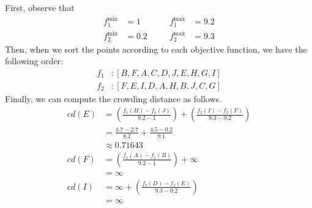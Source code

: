 First, observe that
\[
\begin{aligned}
    f^{\min}_1 &= 1 &\quad& f^{\max}_1 &= 9.2 \\
    f^{\min}_2 &= 0.2 &\quad& f^{\max}_2 &= 9.3
\end{aligned}
\]
Then, when we sort the points according to each objective function, we have the following order:
\[
\begin{aligned}
    f_1 &: [B, F, A, C, D, J, E, H, G, I] \\
    f_2 &: [F, E, I, D, A, H, B, J, C, G]
\end{aligned}
\]
Finally, we can compute the crowding distance as follows.
\[
\begin{aligned}
    cd(E) &= \left(\frac{f_1(H) - f_1(J)}{9.2-1}\right) + \left(\frac{f_2(I) - f_2(F)}{9.3 - 0.2}\right) \\
          &= \frac{4.7 - 2.7}{8.2} + \frac{4.5 - 0.2}{9.1} \\
          &\approx 0.71643 \\
    cd(F) &= \left(\frac{f_1(A) - f_1(B)}{9.2 - 1}\right) + \infty \\
          &= \infty \\
    cd(I) &= \infty + \left(\frac{f_2(D) - f_2(E)}{9.3-0.2}\right) \\
          &= \infty
\end{aligned}
\]
